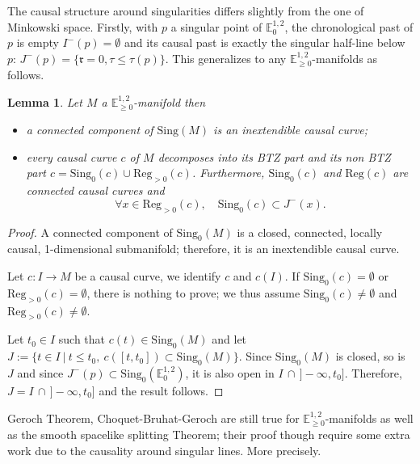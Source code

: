 \documentclass[a4paper,12pt]{article}
\def\r{\mathfrak{r}}
\def\sing{\mathrm{Sing}}
\newcommand{\mass}[1]{{\mathbb E}^{1,2}_{#1}}
\def\Reg{\mathrm{Reg}}
\def\reg{\Reg}
\newtheorem{lemou}{Lemma}[section]          %
\begin{document}
The causal structure around singularities differs slightly from the one of Minkowski space.
 Firstly, with $p$ a singular point of $\mass{0}$, the chronological past of $p$ is empty $I^-(p)=\emptyset$ and its causal past is exactly the singular half-line below $p$: $J^-(p) = \{\r=0,\tau\leq \tau(p)\}$.  This generalizes to any $\mass{\geq0}$-manifolds as follows.
	 \begin{lemou}\label{btzlem:past_BTZ} \label{lem:past_BTZ}
	    Let $M$ a $\mass{\geq0}$-manifold then
	    \begin{itemize}
	    \item a connected component of $\sing(M)$ is an inextendible causal curve;
	    \item every causal curve $c$ of $M$ decomposes into its BTZ part and its non BTZ part $c=\sing_0(c)\cup \reg_{>0}(c)$. Furthermore, $\sing_0(c)$ and $\reg(c)$ are connected causal curves and $$\forall x\in \Reg_{>0}(c),\quad \sing_0(c) \subset J^-(x).$$
	  \end{itemize}
	\end{lemou}
	\begin{proof}
	  A connected component of $\sing_0(M)$ is a closed, connected, locally causal, 1-dimen\-sional submanifold; therefore, 
	  it is an inextendible causal curve. 
	  
	  Let $c:I\rightarrow M$ be a causal curve, we identify $c$ and $c(I)$. If $\sing_0(c)=\emptyset$ or $\reg_{>0}(c)=\emptyset$, there is nothing to prove; 
	  we thus assume $\sing_0(c)\neq\emptyset$ and $\reg_{>0	}(c)\neq \emptyset$. 
	  
	  Let $t_0\in I$ such that $c(t)\in \sing_0(M)$ and let $J:=\{t\in I~|~t\leq t_0, ~ c([t,t_0])\subset \sing_0(M)\}$. Since $
	  \sing_0(M)$	 is closed, so is $J$ and since $J^-(p)\subset 
	  \sing_0(\mass{0})$, it is also open in $I\,\cap\, ]-\infty,t_0]$. Therefore, $J=I\,\cap\, ]-\infty,t_0]$ and the result follows.
	
	
	\end{proof}
 



Geroch Theorem, Choquet-Bruhat-Geroch are still true for $\mass{\geq 0}$-manifolds as well as the smooth spacelike splitting Theorem; their proof though require some extra work due to the causality around singular lines. More precisely.
\end{document}
